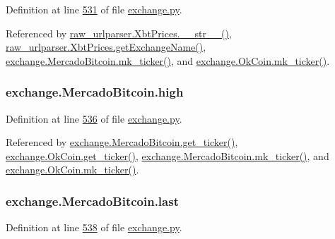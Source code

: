 Definition at line \hyperlink{exchange_8py_source_l00531}{531} of file \hyperlink{exchange_8py_source}{exchange.\+py}.



Referenced by \hyperlink{raw__urlparser_8py_source_l00074}{raw\+\_\+urlparser.\+Xbt\+Prices.\+\_\+\+\_\+str\+\_\+\+\_\+()}, \hyperlink{raw__urlparser_8py_source_l00068}{raw\+\_\+urlparser.\+Xbt\+Prices.\+get\+Exchange\+Name()}, \hyperlink{exchange_8py_source_l00557}{exchange.\+Mercado\+Bitcoin.\+mk\+\_\+ticker()}, and \hyperlink{exchange_8py_source_l00622}{exchange.\+Ok\+Coin.\+mk\+\_\+ticker()}.

\subsubsection[{\texorpdfstring{high}{high}}]{\setlength{\rightskip}{0pt plus 5cm}exchange.\+Mercado\+Bitcoin.\+high}\hypertarget{classexchange_1_1_mercado_bitcoin_a0b9c2d465601a48e3b8838354e931c39}{}\label{classexchange_1_1_mercado_bitcoin_a0b9c2d465601a48e3b8838354e931c39}


Definition at line \hyperlink{exchange_8py_source_l00536}{536} of file \hyperlink{exchange_8py_source}{exchange.\+py}.



Referenced by \hyperlink{exchange_8py_source_l00543}{exchange.\+Mercado\+Bitcoin.\+get\+\_\+ticker()}, \hyperlink{exchange_8py_source_l00608}{exchange.\+Ok\+Coin.\+get\+\_\+ticker()}, \hyperlink{exchange_8py_source_l00557}{exchange.\+Mercado\+Bitcoin.\+mk\+\_\+ticker()}, and \hyperlink{exchange_8py_source_l00622}{exchange.\+Ok\+Coin.\+mk\+\_\+ticker()}.

\subsubsection[{\texorpdfstring{last}{last}}]{\setlength{\rightskip}{0pt plus 5cm}exchange.\+Mercado\+Bitcoin.\+last}\hypertarget{classexchange_1_1_mercado_bitcoin_a5f2759cd17d5dd36bc813c815543f3cc}{}\label{classexchange_1_1_mercado_bitcoin_a5f2759cd17d5dd36bc813c815543f3cc}


Definition at line \hyperlink{exchange_8py_source_l00538}{538} of file \hyperlink{exchange_8py_source}{exchange.\+py}.



